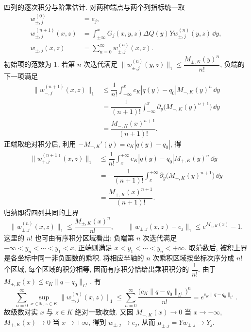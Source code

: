 \par\medskip\noindent 四列的逐次积分与阶乘估计.\quad
对两种端点与两个列指标统一取
\begin{align*}
w_{\pm,j}^{(0)}&=e_j,\\
w_{\pm,j}^{(n+1)}(x,z)
&=\int_{\pm\infty}^{x}
G_j(x,y,z)\Delta Q(y)Yw_{\pm,j}^{(n)}(y,z)\,\dd y,\\
w_{\pm,j}(x,z)&=\sum\limits_{n=0}^{\infty}w_{\pm,j}^{(n)}(x,z).
\end{align*}
初始项的范数为 $1$. 若第 $n$ 次迭代满足
$\|w_{\pm,j}^{(n)}(y,z)\|_1\le\dfrac{M_{\pm,K}(y)^n}{n!}$,
负端的下一项满足
\begin{align*}
\|w_{-,j}^{(n+1)}(x,z)\|_1
&\le\dfrac{1}{n!}\int_{-\infty}^{x}
c_K|q(y)-q_0|M_{-,K}(y)^n\,\dd y\\
&=\dfrac{1}{(n+1)!}\int_{-\infty}^{x}
\partial_y\bigl(M_{-,K}(y)^{n+1}\bigr)\,\dd y\\
&=\dfrac{M_{-,K}(x)^{n+1}}{(n+1)!}.
\end{align*}
正端取绝对积分后, 利用 $-M_{+,K}'(y)=c_K|q(y)-q_0|$, 得
\begin{align*}
\|w_{+,j}^{(n+1)}(x,z)\|_1
&\le\dfrac{1}{n!}\int_x^{+\infty}
c_K|q(y)-q_0|M_{+,K}(y)^n\,\dd y\\
&=-\dfrac{1}{(n+1)!}\int_x^{+\infty}
\partial_y\bigl(M_{+,K}(y)^{n+1}\bigr)\,\dd y\\
&=\dfrac{M_{+,K}(x)^{n+1}}{(n+1)!}.
\end{align*}
归纳即得四列共同的上界
\begin{equation*}
\|w_{\pm,j}^{(n)}(x,z)\|_1
\le\dfrac{M_{\pm,K}(x)^n}{n!},\qquad
\|w_{\pm,j}(x,z)-e_j\|_1
\le e^{M_{\pm,K}(x)}-1.
\end{equation*}
这里的 $n!$ 也可由有序积分区域看出: 负端第 $n$ 次迭代满足
$-\infty<y_n<\cdots<y_1<x$, 正端则满足
$x<y_1<\cdots<y_n<+\infty$.
取范数后, 被积上界是各坐标中同一非负函数的乘积.
将相应半轴的 $n$ 次乘积区域按坐标次序分成 $n!$ 个区域,
每个区域的积分相等, 因而有序积分恰给出乘积积分的 $\dfrac{1}{n!}$.
由于 $M_{\pm,K}(x)\le c_K\|q-q_0\|_{L^1}$, 有
\begin{equation*}
\sum\limits_{n=0}^{\infty}
\sup\limits_{x\in\mathbb R,\,z\in K}\|w_{\pm,j}^{(n)}(x,z)\|_1
\le\sum\limits_{n=0}^{\infty}
\dfrac{\bigl(c_K\|q-q_0\|_{L^1}\bigr)^n}{n!}
=e^{c_K\|q-q_0\|_{L^1}}.
\end{equation*}
故级数对实 $x$ 与 $z\in K$ 绝对一致收敛.
又因 $M_{-,K}(x)\to0$ 当 $x\to-\infty$,
$M_{+,K}(x)\to0$ 当 $x\to+\infty$, 得到
$w_{\pm,j}\to e_j$, 从而 $\mu_{\pm,j}=Yw_{\pm,j}\to Y_j$.

